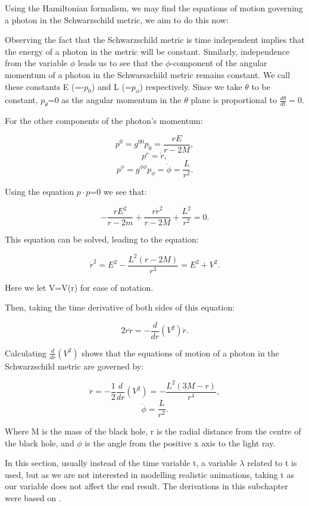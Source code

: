 \documentclass[oneside,openright,frontopenright, singlespacing]{dmathesis}
\begin{document}
	Using the Hamiltonian formalism, we may find the equations of motion governing a photon in the Schwarzschild metric, we aim to do this now:

	Observing the fact that the Schwarzschild metric is time independent implies that the energy of a photon in the metric will be constant. Similarly, independence from the variable $\phi$ leads us to see that the $\phi$-component of the angular momentum of a photon in the Schwarszchild metric remains constant. We call these constants E (=-$p_0$) and L (=$p_\phi$) respectively. Since we take ${\theta}$ to be constant, $p_\theta$=0 as the angular momentum in the $\theta$ plane is proportional to $\frac{d\theta}{dt}=0$.

\vspace{1em}
	For the other components of the photon's momentum:

	\[p^0 = g^{00}p_0 = \frac{rE}{r-2M},\]
	\[p^r = \dot{r},\]
	\[p^\phi = g^{\phi\phi}p_\phi = \dot{\phi} = \frac{L}{r^2}.\]

\vspace{1em}
	Using the equation $p \cdot p$=0 we see that:

	\[-\frac{rE^2}{r-2m}+\frac{r\dot{r}^2}{r-2M}+\frac{L^2}{r^2}=0.\]

\vspace{1em}
	This equation can be solved, leading to the equation:

	\[\dot{r}^2 = E^2-\frac{L^2(r-2M)}{r^3} = E^2 + V^2.\]

\vspace{1em}
	Here we let V=V(r) for ease of notation.

\vspace{1em}
	Then, taking the time derivative of both sides of this equation:

	\[2\dot{r}\ddot{r} = -\frac{d}{dr}(V^2)\dot{r}.\]

\vspace{1em}
	Calculating $\frac{d}{dr}(V^2)$ shows that the equations of motion of a photon in the Schwarzschild metric are governed by:

	\[\ddot{r} = -\frac{1}{2}\frac{d}{dr}(V^2) = -\frac{L^2(3M-r)}{r^4},\]
	\[\dot{\phi}=\frac{L}{r^2}.\]

\vspace{1em}
	Where M is the mass of the black hole, r is the radial distance from the centre of the black hole, and $\phi$ is the angle from the positive x axis to the light ray.

\vspace{1em}
	In this section, usually instead of the time variable t, a variable $\lambda$ related to t is used, but as we are not interested in modelling realistic animations, taking t as our variable does not affect the end result. The derivations in this subchapter were based on \cite[pg. 283-285]{schutz2009first}.
\end{document}

